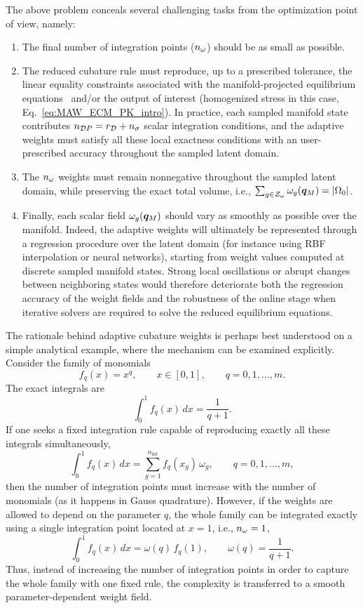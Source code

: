 \documentclass[11pt,a4paper]{article}
\begin{document}
The above problem conceals several challenging tasks from the optimization
point of view, namely:
\begin{enumerate}

 \item \label{item:MAW_sparsity} The final number of integration points (\(n_{\omega}\)) should be as small
as possible.

\item \label{item:MAW_equa} The reduced cubature rule must reproduce, up to a prescribed tolerance,
the linear equality constraints associated with the manifold-projected
equilibrium equations~ and/or the output of interest (homogenized stress in this case, Eq.~\ref{eq:MAW_ECM_PK_intro}). In practice, each sampled
manifold state contributes \(n_{\mathcal{D}P}=r_{\mathcal{D}}+n_{\sigma}\) scalar integration
conditions, and the adaptive weights must satisfy all these local exactness
conditions with an user-prescribed accuracy throughout the sampled latent domain.

\item \label{item:positive}  The \(n_{\omega}\) weights must remain nonnegative throughout the sampled
latent domain, while preserving the exact total volume, i.e.,
\(\sum_{g\in\mathcal{Z}_{\omega}}\omega_{g}(\bm{q}_M)=|\Omega_0|\).

\item \label{item:smooth}   Finally, each scalar field \(\omega_{g}(\bm{q}_M)\) should vary as smoothly
as possible over the manifold. Indeed, the adaptive weights will ultimately be
represented through a regression procedure over the latent domain (for instance
using RBF interpolation or neural networks), starting from weight values
computed at discrete sampled manifold states. Strong local oscillations or
abrupt changes between neighboring states would therefore deteriorate both the
regression accuracy of the weight fields and the robustness of the online stage
when iterative solvers are required to solve the reduced equilibrium equations.

\end{enumerate}


The rationale behind adaptive cubature weights is perhaps best understood on a
simple analytical example, where the mechanism can be examined explicitly. Consider the family of monomials
\[
    f_q(x)=x^q,
    \qquad
    x\in[0,1],
    \qquad
    q=0,1,\ldots,m .
\]
The exact integrals are
\[
    \int_0^1 f_q(x)\,dx
    =
    \frac{1}{q+1}.
\]
If one seeks a fixed integration rule capable of reproducing exactly all these
integrals simultaneously,
\[
    \int_0^1 f_q(x)\,dx
    =
    \sum_{g=1}^{n_{\mathrm{int}}}
    f_q(x_g)\,\omega_g,
    \qquad
    q=0,1,\ldots,m ,
\]
then the number of integration points must increase with the number of
monomials (as it happens in Gauss quadrature). However, if the weights are allowed to depend on the parameter \(q\), the whole
family can be integrated exactly using a single integration point located at
\(x=1\), i.e., \(n_{\omega}=1\),
\[
    \int_0^1 f_q(x)\,dx
    =
    \omega(q)\,f_q(1),
    \qquad
    \omega(q)=\frac{1}{q+1}.
\]
Thus, instead of increasing the number of integration points in order to
capture the whole family with one fixed rule, the complexity is transferred to
a smooth parameter-dependent weight field.
\end{document}
